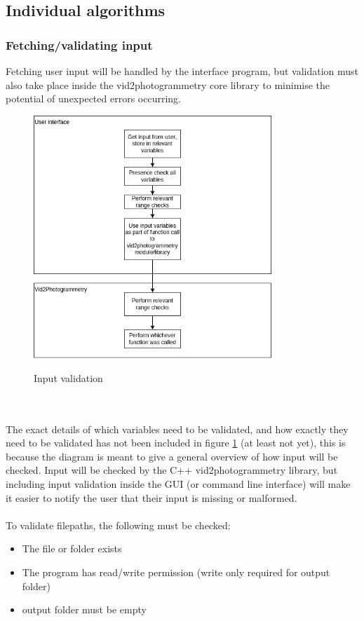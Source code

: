 \documentclass[11pt]{report}
\begin{document}
\subsection{Individual algorithms}
\subsubsection{Fetching/validating input}
Fetching user input will be handled by the interface program, but validation must also take place inside the vid2photogrammetry core library to minimise the potential of unexpected errors occurring.
\begin{figure}[h!]
	\centering
	\caption{Input validation}
	\includegraphics[width=0.8\textwidth]{designDiagrams/fetchingValidatingInput}
	\label{fig:fetchingValidatingInput}
\end{figure}\\\\
The exact details of which variables need to be validated, and how exactly they need to be validated has not been included in figure \ref{fig:fetchingValidatingInput} (at least not yet), this is because the diagram is meant to give a general overview of how input will be checked. Input will be checked by the C++ vid2photogrammetry library, but including input validation inside the GUI (or command line interface) will make it easier to notify the user that their input is missing or malformed.\\\\
To validate filepaths, the following must be checked:
\begin{itemize}
\item The file or folder exists
\item The program has read/write permission (write only required for output folder)
\item output folder must be empty
\end{itemize}
\end{document}
